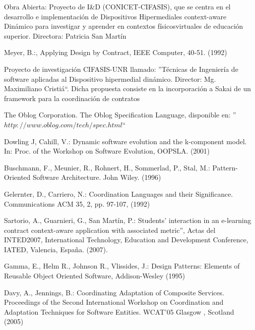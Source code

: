 \begin{thebibliography}{1}
{Obra Abierta: Proyecto de I\&D (CONICET-CIFASIS), que se centra en el
desarrollo e implementación de Dispositivos Hipermediales context-aware Dinámico
para investigar y aprender en contextos físicos\-virtuales de educación
superior. Directora: Patricia San Martín}

Meyer, B.:, {Applying Design by Contract, IEEE Computer, 40-51. (1992)}


{Proyecto de investigación CIFASIS-UNR llamado: ''Técnicas de Ingeniería de
software aplicadas al Dispositivo hipermedial dinámico. Director: Mg.
Maximiliano Cristiá``}. Dicha propuesta consiste en la incorporación a Sakai de
un framework para la coordinación de contratos \cite{fiadeiro,tc}

The Oblog Corporation. {The Oblog Specification Language, disponible en:
''$http://www.oblog.com/tech/spec.html$``}

Dowling J, Cahill, V.: {Dynamic software evolution and the k-component model.
In: Proc. of the Workshop on Software Evolution, OOPSLA. (2001)}


Buschmann, F., Meunier, R., Rohnert, H., Sommerlad, P., Stal, M.: {Pattern-
Oriented Software Architecture. John Wiley. (1996)}




Gelernter, D., Carriero, N.: {Coordination Languages and their
Significance. Communications ACM 35, 2, pp. 97-107, (1992)}


Sartorio, A., Guarnieri, G., San Martín,  P.: {Students’ interaction in an
e-learning
contract context-aware application with associated metric”, Actas del
INTED2007, International Technology, Education and Development Conference,
IATED, Valencia, España. (2007).}

Gamma, E., Helm R., Johnson R., Vlissides, J.: {Design Patterns: Elements of
Reusable Object Oriented Software, Addison-Wesley (1995)}

Davy, A., Jennings, B.: {Coordinating Adaptation of Composite
Services. Proceedings of the Second International Workshop on Coordination and
Adaptation Techniques for Software Entities. WCAT’05 Glasgow , Scotland (2005)}



\end{thebibliography}
